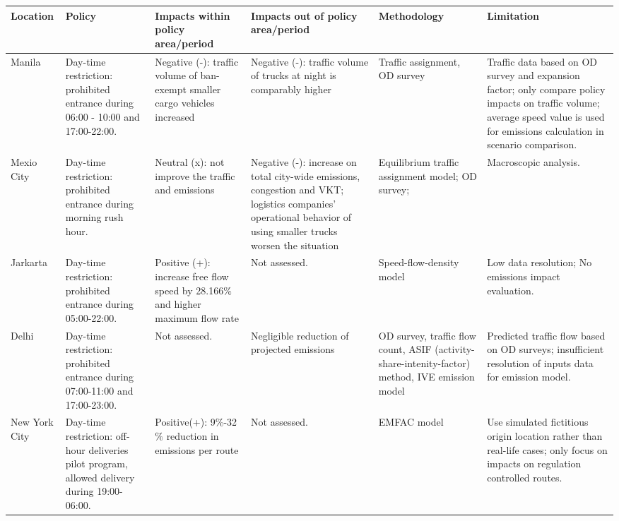 \documentclass[preprint,12pt,3p]{elsarticle}
\begin{document}
\begin{landscape}


\footnotesize
\centering
{}
\label{table2}


\begin{longtable}{m{2cm}<{\centering} m{3cm} m{4cm} m{4cm} m{3cm} m{6cm}}
\toprule[1.2pt]
  \textbf{Location} &\textbf{Policy} &\textbf{Impacts within policy area/period} &\textbf{Impacts out of policy area/period} &\textbf{Methodology} &\textbf{Limitation}\\

  \midrule
   Manila \cite{RN154} & Day-time restriction: prohibited entrance during 06:00 - 10:00 and 17:00-22:00. & Negative (-): traffic volume of ban-exempt smaller cargo vehicles increased & Negative (-): traffic volume of trucks at night is comparably higher & Traffic assignment, OD survey & Traffic data based on OD survey and expansion factor; only compare policy impacts on traffic volume; average speed value is used for emissions calculation in scenario comparison. \\

   Mexio City \cite{RN61} & Day-time restriction: prohibited entrance during morning rush hour. & Neutral (x): not improve the traffic and emissions & Negative (-): increase on total city-wide emissions, congestion and VKT; logistics companies’ operational behavior of using smaller trucks worsen the situation & Equilibrium traffic assignment model; OD survey; & Macroscopic analysis. \\
 
   Jarkarta \cite{RN71}& Day-time restriction: prohibited entrance  during 05:00-22:00. & Positive (+): increase free flow speed by 28.166$\%$ and higher maximum flow rate & Not assessed. & Speed-flow-density model & Low data resolution; No emissions impact evaluation. \\
   
   Delhi \cite{RN86}& Day-time restriction: prohibited entrance during 07:00-11:00 and 17:00-23:00. & Not assessed. & Negligible reduction of projected emissions & OD survey, traffic flow count, ASIF (activity-share-intenity-factor) method, IVE emission model & Predicted traffic flow based on OD surveys; insufficient resolution of inputs data for emission model. \\
   
   New York City \cite{RN53} & Day-time restriction: off-hour deliveries pilot program, allowed delivery during 19:00-06:00. & Positive(+): 9$\%$-32$\%$ reduction in emissions per route & Not assessed. & EMFAC model & Use simulated fictitious origin location rather than real-life cases; only focus on impacts on regulation controlled routes. \\
   

\end{longtable}
\end{landscape}
\end{document}
